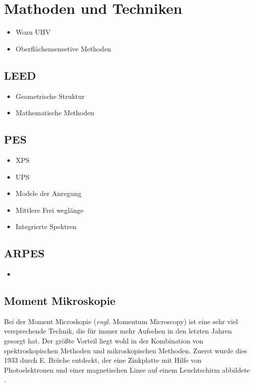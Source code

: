 \chapter{Mathoden und Techniken}
    \begin{itemize}
        \item Wozu UHV
        \item Oberflächensensetive Methoden
    \end{itemize}
\section{LEED}
    \begin{itemize}
        \item Geometrische Struktur
        \item Mathematische Methoden
    \end{itemize}
\section{PES}
    \begin{itemize}
        \item XPS
        \item UPS
        \item Modele der Anregung
        \item Mittlere Frei weglänge
        \item Integrierte Spektren
    \end{itemize}

\section{ARPES}
    \begin{itemize}
        \item 
    \end{itemize}

    \section{Moment Mikroskopie} \label{sec:MM}
        Bei der Moment Microskopie (\textit{engl.} Momentum Microscopy) ist eine sehr viel versprechende Technik, die für immer mehr Aufsehen in den letzten Jahren gesorgt hat.
        Der größte Vorteil liegt wohl in der Kombination von spektroskopischen Methoden und mikroskopischen Methoden.
        Zuerst wurde dies 1933 durch E. Brüche entdeckt, der eine Zinkplatte mit Hilfe von Photoelektronen und einer magnetischen Linse auf einem Leuchtschirm abbildete \cite{bruche_elektronenmikroskopische_1933}.

